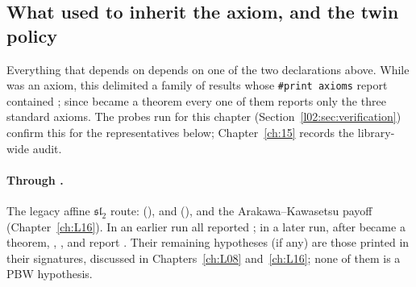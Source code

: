 \subsection{What used to inherit the axiom, and the twin policy}

Everything that depends on  depends on one of the two declarations above. While
 was an axiom, this delimited a family of results whose \texttt{\#print axioms} report contained
; since  became a theorem every one of them reports only the three standard axioms. The
probes run for this chapter (Section~\ref{l02:sec:verification}) confirm this for the representatives
below; Chapter~\ref{ch:15} records the library-wide audit.

\paragraph{Through .} The legacy affine $\mathfrak{sl}_2$ route:
\allowbreak{}\allowbreak{}\allowbreak{} (),
\allowbreak{}\allowbreak{}\allowbreak{}\allowbreak{}\allowbreak{} and \allowbreak{}\allowbreak{}\allowbreak{}
(), \allowbreak{}\allowbreak{}\allowbreak{}\allowbreak{} and the
Arakawa--Kawasetsu payoff \allowbreak{}\allowbreak{}\allowbreak{}
(Chapter~\ref{ch:L16}). In an earlier run all reported ; in a later run, after  became a theorem, \allowbreak{}\allowbreak{}, \allowbreak{}\allowbreak{}\allowbreak{},
\allowbreak{}\allowbreak{}\allowbreak{} and \allowbreak{}\allowbreak{} report
. Their remaining hypotheses (if any) are those printed in
their signatures, discussed in Chapters~\ref{ch:L08} and~\ref{ch:L16}; none of them is a PBW hypothesis.

